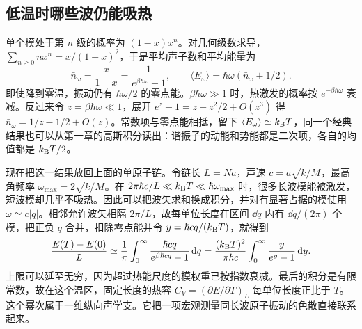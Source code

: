\subsection{低温时哪些波仍能吸热}
单个模处于第 $n$ 级的概率为 $(1-x)x^n$。对几何级数求导，$\sum_{n\ge0}n x^n=x/(1-x)^2$，于是平均声子数和平均能量为
\begin{equation}\label{phonon:thermal-occupation}
 \bar n_\omega=\frac{x}{1-x}=\frac{1}{e^{\beta\hbar\omega}-1},\qquad
 \langle E_\omega\rangle=\hbar\omega(\bar n_\omega+1/2).
\end{equation}
即使降到零温，振动仍有 $\hbar\omega/2$ 的零点能。$\beta\hbar\omega\gg1$ 时，热激发的概率按 $e^{-\beta\hbar\omega}$ 衰减。反过来令 $z=\beta\hbar\omega\ll1$，展开 $e^z-1=z+z^2/2+O(z^3)$ 得 $\bar n_\omega=1/z-1/2+O(z)$。常数项与零点能相抵，留下 $\langle E_\omega\rangle\simeq k_{\mathrm B} T$，同一个经典结果也可以从第一章的高斯积分读出：谐振子的动能和势能都是二次项，各自的均值都是 $k_{\mathrm B} T/2$。

现在把这一结果放回上面的单原子链。令链长 $L=Na$，声速 $c=a\sqrt{k/M}$，最高角频率 $\omega_{\max}=2\sqrt{k/M}$。在 $2\pi\hbar c/L\ll k_{\mathrm B} T\ll\hbar\omega_{\max}$ 时，很多长波模能被激发，短波模却几乎不吸热。因此可以把波矢求和换成积分，并对有显著占据的模使用 $\omega\simeq c|q|$。相邻允许波矢相隔 $2\pi/L$，故每单位长度在区间 $\dd q$ 内有 $\dd q/(2\pi)$ 个模，把正负 $q$ 合并，扣除零点能并令 $y=\hbar c q/(k_{\mathrm B} T)$，就得到
\[
 \frac{E(T)-E(0)}{L}
 \simeq \frac{1}{\pi}\int_0^\infty\frac{\hbar c q}{e^{\beta\hbar c q}-1}\,\mathrm{d} q
 =\frac{(k_{\mathrm B} T)^2}{\pi\hbar c}\int_0^\infty\frac{y}{e^y-1}\,\mathrm{d} y .
\]
上限可以延至无穷，因为超过热能尺度的模权重已按指数衰减。最后的积分是有限常数，故在这个温区，固定长度的热容 $C_V=(\partial E/\partial T)_L$ 每单位长度正比于 $T$。这个幂次属于一维纵向声学支。它把一项宏观测量同长波原子振动的色散直接联系起来。
